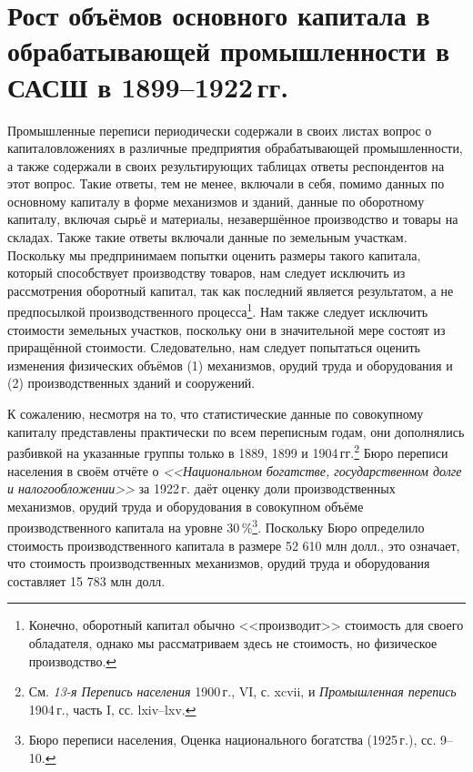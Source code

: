 \documentclass[leqno]{article}  %
\begin{document}
\section{Рост объёмов основного капитала в обрабатывающей промышленности в САСШ в 1899--1922\,гг.}

Промышленные переписи периодически содержали в своих листах вопрос о капиталовложениях в различные предприятия обрабатывающей промышленности, а также содержали в своих результирующих таблицах ответы респондентов на этот вопрос. Такие ответы, тем не менее, включали в себя, помимо данных по основному капиталу в форме механизмов и зданий, данные по оборотному капиталу, включая сырьё и материалы, незавершённое производство и товары на складах. Также такие ответы включали данные по земельным участкам. Поскольку мы предпринимаем попытки оценить размеры такого капитала, который способствует производству товаров, нам следует исключить из рассмотрения оборотный капитал, так как последний является результатом, а не предпосылкой производственного процесса\footnote{Конечно, оборотный капитал обычно <<производит>> стоимость для своего обладателя, однако мы рассматриваем здесь не стоимость, но физическое производство.}. Нам также следует исключить стоимости земельных участков, поскольку они в значительной мере состоят из приращённой стоимости. Следовательно, нам следует попытаться оценить изменения физических объёмов (1) механизмов, орудий труда и оборудования и (2) производственных зданий и сооружений.
\par
К сожалению, несмотря на то, что статистические данные по совокупному капиталу представлены практически по всем переписным годам, они дополнялись разбивкой на указанные группы только в 1889, 1899 и 1904\,гг.\footnote{См. \emph{13-я Перепись населения} 1900\,г., VI, с. xcvii, и \emph{Промышленная перепись} 1904\,г., часть I, сс. lxiv--lxv.}  Бюро переписи населения в своём отчёте о \emph{<<Национальном богатстве, государственном долге и налогообложении>>} за 1922\,г. даёт оценку доли производственных механизмов, орудий труда и оборудования в совокупном объёме производственного капитала на уровне 30\,\%\footnote{Бюро переписи населения, Оценка национального богатства (1925\,г.), сс. 9--10.}. Поскольку Бюро определило стоимость производственного капитала в размере 52 610 млн долл., это означает, что стоимость производственных механизмов, орудий труда и оборудования составляет 15 783 млн долл.
\par
\end{document}
